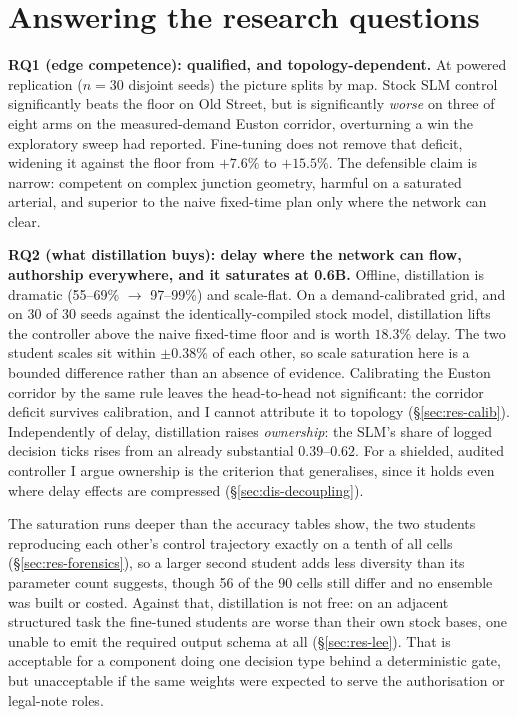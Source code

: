 \section{Answering the research questions}\label{sec:dis-rqs}
\textbf{RQ1 (edge competence): qualified, and topology-dependent.} At
powered replication ($n{=}30$ disjoint seeds) the picture splits by map.
Stock SLM control significantly beats the floor on Old Street, but is
significantly \emph{worse} on three of eight arms on the measured-demand
Euston corridor, overturning a win the exploratory sweep had reported.
Fine-tuning does not remove that deficit, widening it against the floor
from $+7.6\%$ to $+15.5\%$. The defensible claim is narrow: competent on
complex junction geometry, harmful on a saturated arterial, and superior to the naive fixed-time plan only where the
network can clear.

\textbf{RQ2 (what distillation buys): delay where the network can flow,
authorship everywhere, and it saturates at 0.6B.} Offline, distillation is
dramatic (55--69\% $\to$ 97--99\%) and scale-flat. On a demand-calibrated
grid, and
on 30 of 30 seeds against the identically-compiled stock model,
distillation lifts the controller above the naive fixed-time floor and is
worth $18.3\%$ delay. The two student scales sit within $\pm0.38\%$ of
each other, so scale saturation here is a bounded difference rather than
an absence of evidence. Calibrating the Euston corridor by the same rule
leaves the head-to-head not significant: the corridor deficit survives
calibration, and I cannot attribute it to topology
(\S\ref{sec:res-calib}). Independently of delay, distillation raises
\emph{ownership}: the SLM's share of logged decision ticks rises from an
already substantial $0.39$--$0.62$. For a shielded, audited controller I
argue ownership is the criterion that generalises, since it holds even
where delay effects are compressed (\S\ref{sec:dis-decoupling}).

The saturation runs deeper than the accuracy tables show, the two students
reproducing each other's control trajectory exactly on a tenth of all
cells (\S\ref{sec:res-forensics}), so a larger second student adds less
diversity than its parameter count suggests, though 56 of the 90 cells
still differ and no ensemble was built or costed. Against that,
distillation is not free: on an adjacent structured task the fine-tuned
students are worse than their own stock bases, one unable to emit the
required output schema at all (\S\ref{sec:res-lee}). That is acceptable
for a component doing one decision type behind a deterministic gate, but
unacceptable if the same weights were expected to serve the authorisation
or legal-note roles.

